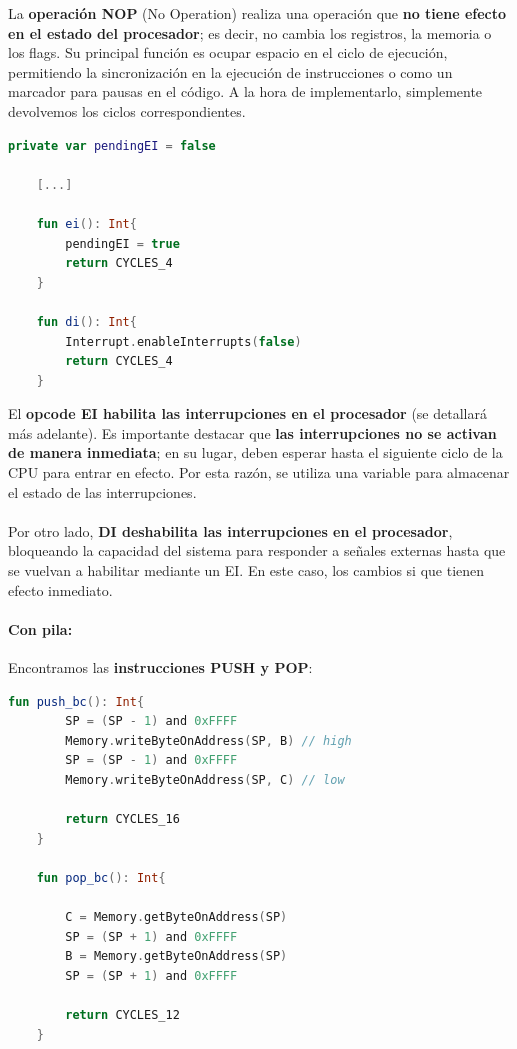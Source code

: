 La \textbf{operación NOP} (No Operation) realiza una operación que \textbf{no tiene efecto en el estado del procesador}; es decir, no cambia los registros, la memoria o los flags. Su principal función es ocupar espacio en el ciclo de ejecución, permitiendo la sincronización en la ejecución de instrucciones o como un marcador para pausas en el código. A la hora de implementarlo, simplemente devolvemos los ciclos correspondientes.

\begin{lstlisting}[language=Kotlin, caption={Operaciones DI, EI}, label={code:kotlindiei}]
    private var pendingEI = false

    [...]

    fun ei(): Int{
        pendingEI = true
        return CYCLES_4
    }

    fun di(): Int{
        Interrupt.enableInterrupts(false)
        return CYCLES_4
    }
\end{lstlisting}

El \textbf{opcode EI habilita las interrupciones en el procesador} (se detallará más adelante). Es importante destacar que \textbf{las interrupciones no se activan de manera inmediata}; en su lugar, deben esperar hasta el siguiente ciclo de la CPU para entrar en efecto. Por esta razón, se utiliza una variable para almacenar el estado de las interrupciones.
\\\\
Por otro lado, \textbf{DI deshabilita las interrupciones en el procesador}, bloqueando la capacidad del sistema para responder a señales externas hasta que se vuelvan a habilitar mediante un EI. En este caso, los cambios si que tienen efecto inmediato.

\paragraph{Con pila:} Encontramos las \textbf{instrucciones PUSH y POP}:

\begin{lstlisting}[language=Kotlin, caption={Operaciones PUSH, POP}, label={code:kotlinpushpop}]
    fun push_bc(): Int{
        SP = (SP - 1) and 0xFFFF
        Memory.writeByteOnAddress(SP, B) // high
        SP = (SP - 1) and 0xFFFF
        Memory.writeByteOnAddress(SP, C) // low

        return CYCLES_16
    }

    fun pop_bc(): Int{

        C = Memory.getByteOnAddress(SP)
        SP = (SP + 1) and 0xFFFF
        B = Memory.getByteOnAddress(SP)
        SP = (SP + 1) and 0xFFFF

        return CYCLES_12
    }
\end{lstlisting}

